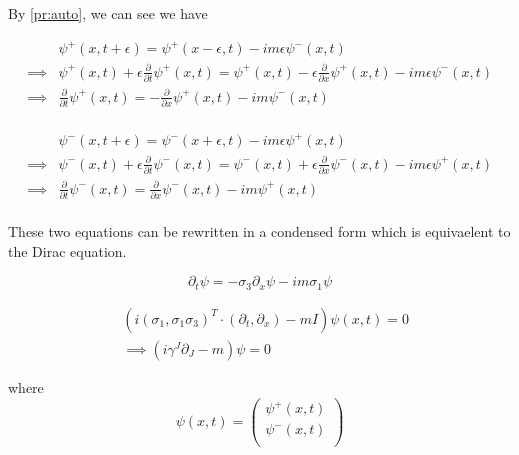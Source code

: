 \documentclass{article}
\newcommand{\e}{\epsilon}
\begin{document}
By \ref{pr:auto}, we can see we have

\begin{equation}
\begin{split}
  &\psi^+(x, t+\e) = \psi^+(x-\e, t) - im\e \psi^-(x, t) \\
  \implies &\psi^+(x, t) + \e \frac{\partial}{\partial t}\psi^+(x, t) = \psi^+(x, t) - \e \frac{\partial}{\partial x} \psi^+(x, t) - im\e \psi^-(x, t) \\
  \implies & \frac{\partial}{\partial t}\psi^+(x, t) = - \frac{\partial}{\partial x} \psi^+(x, t) - im \psi^-(x, t) \\
 \end{split}
\end{equation}

\begin{equation}
\begin{split}
   &\psi^-(x, t+\e) = \psi^-(x+\e, t) - im\e \psi^+(x, t) \\
  \implies &\psi^-(x, t) + \e \frac{\partial}{\partial t}\psi^-(x, t) = \psi^-(x, t) + \e \frac{\partial}{\partial x} \psi^-(x, t) - im\e \psi^+(x, t) \\
  \implies & \frac{\partial}{\partial t}\psi^-(x, t) = \frac{\partial}{\partial x} \psi^-(x, t) - im \psi^+(x, t) \\
 \end{split}
\end{equation}

These two equations can be rewritten in a condensed form which is equivaelent to the Dirac equation.

\begin{equation}
 \partial_t \psi = - \sigma_3 \partial_x \psi - im \sigma_1 \psi
\end{equation}

\begin{equation}
\begin{split}
 &(i(\sigma_1, \sigma_1 \sigma_3)^T \cdot (\partial_t, \partial_x) - mI) \psi(x, t) = 0 \\
 &\implies (i \gamma^J \partial_J - m) \psi = 0
\end{split}
\end{equation}

where
\begin{equation}
 \psi(x, t) = \begin{pmatrix}
         \psi^+(x, t)\\
         \psi^-(x, t)\\
        \end{pmatrix}
\end{equation}
\end{document}
